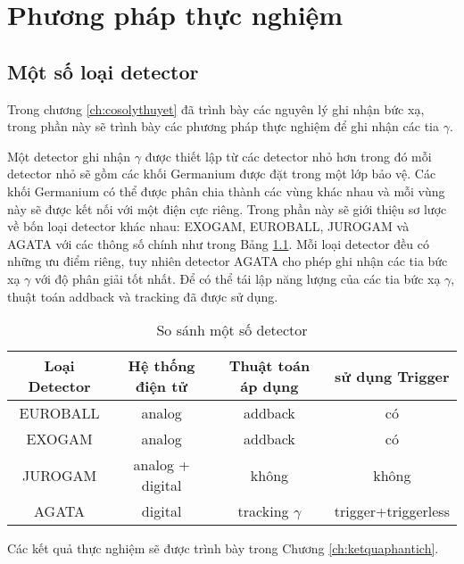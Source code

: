 \chapter{Phương pháp thực nghiệm}
\label{ch:thucnghiem}


\section{Một số loại detector}

Trong chương \ref{ch:cosolythuyet} đã trình bày các nguyên lý ghi nhận bức xạ, trong phần này sẽ trình bày các phương pháp thực nghiệm để ghi nhận các tia $\gamma$.

Một detector ghi nhận $\gamma$ được thiết lập từ các detector nhỏ hơn trong đó mỗi detector nhỏ sẽ gồm các khối Germanium được đặt trong một lớp bảo vệ. Các khối Germanium có thể được phân chia thành các vùng khác nhau  và mỗi vùng này sẽ được kết nối với một điện cực riêng. Trong phần này sẽ giới thiệu sơ lược về bốn loại detector khác nhau: EXOGAM, EUROBALL, JUROGAM và AGATA\cite{bib_Bazzaco, bib_Simpson} với các thông số chính như trong Bảng \ref{table:detector}. Mỗi loại detector đều có những ưu điểm riêng, tuy nhiên detector AGATA cho phép ghi nhận các tia bức xạ  $\gamma$ với độ phân giải tốt nhất. Để có thể tái lập năng lượng của các tia bức xạ $\gamma$, thuật toán addback và tracking đã được sử dụng.

\begin{table}[!h]
\caption{So sánh một số detector}
\centering
\begin{tabular}{|c|c|c|c|}
\hline 
Loại Detector & Hệ thống điện tử & Thuật toán áp dụng & sử dụng Trigger \\ 
\hline 
EUROBALL & analog & addback & có \\ 
\hline 
EXOGAM & analog & addback & có \\ 
\hline 
JUROGAM & analog + digital & không & không \\ 
\hline 
AGATA & digital & tracking $\gamma$ & trigger+triggerless \\ 
\hline 
\end{tabular} 
\label{table:detector}
\end{table}

Các kết quả thực nghiệm sẽ được trình bày trong Chương \ref{ch:ketquaphantich}.
 



